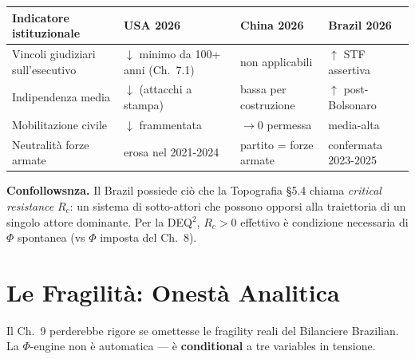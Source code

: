 {\def\LTcaptype{none} %
{\small\begin{longtable}[]{@{}
  >{\raggedright\arraybackslash}p{}
  >{\raggedright\arraybackslash}p{}
  >{\raggedright\arraybackslash}p{}
  >{\raggedright\arraybackslash}p{}@{}}
\toprule\noalign{}
\begin{minipage}[b]{\linewidth}\raggedright
Indicatore istituzionale
\end{minipage} & \begin{minipage}[b]{\linewidth}\raggedright
USA 2026
\end{minipage} & \begin{minipage}[b]{\linewidth}\raggedright
China 2026
\end{minipage} & \begin{minipage}[b]{\linewidth}\raggedright
Brazil 2026
\end{minipage} \\
\midrule\noalign{}
\endhead
\bottomrule\noalign{}
\endlastfoot
Vincoli giudiziari sull'esecutivo & \(\downarrow\) minimo da 100+ anni
(Ch.~7.1) & non applicabili & \(\uparrow\) STF assertiva \\
Indipendenza media & \(\downarrow\) (attacchi a stampa) & bassa per
costruzione & \(\uparrow\) post-Bolsonaro \\
Mobilitazione civile & \(\downarrow\) frammentata & \(\to 0\) permessa &
media-alta \\
Neutralità forze armate & erosa nel 2021-2024 & partito = forze armate &
confermata 2023-2025 \\
\end{longtable}}
}

\Proved{} \textbf{Confollowsnza.} Il Brazil possiede ciò che la
Topografia \S{}5.4 chiama \emph{critical resistance} \(R_c\): un sistema di
sotto-attori che possono opporsi alla traiettoria di un singolo attore
dominante. Per la DEQ$^2$, \(R_c > 0\) effettivo è condizione necessaria di
\(\Phi\) spontanea (vs \(\Phi\) imposta del Ch.~8).



\section{Le Fragilità: Onestà
Analitica}\label{le-fragilituxe0-onestuxe0-analitica}

Il Ch.~9 perderebbe rigore se omettesse le fragility reali del
Bilanciere Brazilian. La \(\Phi\)-engine non è automatica --- è
\textbf{conditional} a tre variables in tensione.

